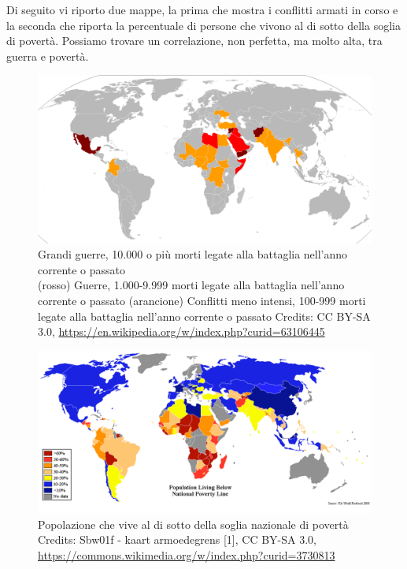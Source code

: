 \documentclass[12pt]{book} %
\begin{document}
\bigskip

Di seguito vi riporto due mappe, la prima che mostra i conflitti armati in corso e la seconda che riporta la percentuale
di persone che vivono al di sotto della soglia di povertà. Possiamo trovare un correlazione, non perfetta, ma molto
alta, tra guerra e povertà.

\begin{figure}[H]
  \begin{minipage}{17cm}
    \includegraphics[width=17cm]{images/Libro-img033.png}
    \caption{Grandi guerre, 10.000 o più morti legate alla battaglia nell'anno corrente o passato\\
(rosso) Guerre, 1.000-9.999 morti legate alla battaglia nell'anno corrente o passato
(arancione) Conflitti meno intensi, 100-999 morti legate alla battaglia nell'anno corrente o passato
Credits: CC BY-SA 3.0, \protect\url{https://en.wikipedia.org/w/index.php?curid=63106445}  }
  \end{minipage}
\end{figure}

\begin{figure}[H]
  \begin{minipage}{17cm}
    \includegraphics[width=17cm]{images/Libro-img034.png}
    \caption{Popolazione che vive al di sotto della soglia nazionale di povertà \\
Credits: Sbw01f - kaart armoedegrens [1], CC BY-SA 3.0, \protect\url{https://commons.wikimedia.org/w/index.php?curid=3730813}}
  \end{minipage}
\end{figure}
\end{document}
